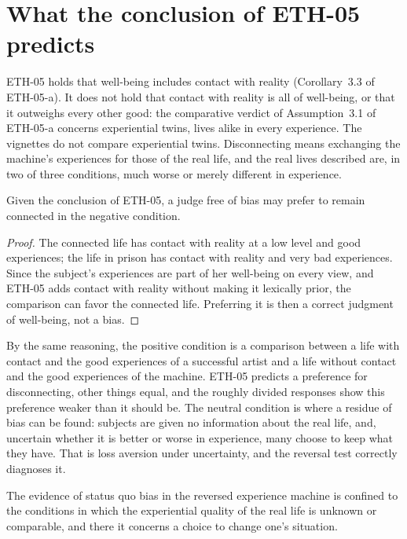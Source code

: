 \documentclass{situationist-preprint}
\begin{document}
\section{What the conclusion of ETH-05 predicts}

ETH-05 holds that well-being includes contact with reality (Corollary~3.3 of ETH-05-a). It does not hold that contact with reality is all of well-being, or that it outweighs every other good: the comparative verdict of Assumption~3.1 of ETH-05-a concerns experiential twins, lives alike in every experience. The vignettes do not compare experiential twins. Disconnecting means exchanging the machine's experiences for those of the real life, and the real lives described are, in two of three conditions, much worse or merely different in experience.

\begin{proposition}\label{p:negative}
Given the conclusion of ETH-05, a judge free of bias may prefer to remain connected in the negative condition.
\end{proposition}

\begin{proof}
The connected life has contact with reality at a low level and good experiences; the life in prison has contact with reality and very bad experiences. Since the subject's experiences are part of her well-being on every view, and ETH-05 adds contact with reality without making it lexically prior, the comparison can favor the connected life. Preferring it is then a correct judgment of well-being, not a bias.
\end{proof}

By the same reasoning, the positive condition is a comparison between a life with contact and the good experiences of a successful artist and a life without contact and the good experiences of the machine. ETH-05 predicts a preference for disconnecting, other things equal, and the roughly divided responses show this preference weaker than it should be. The neutral condition is where a residue of bias can be found: subjects are given no information about the real life, and, uncertain whether it is better or worse in experience, many choose to keep what they have. That is loss aversion under uncertainty, and the reversal test correctly diagnoses it.

\begin{corollary}\label{c:residue}
The evidence of status quo bias in the reversed experience machine is confined to the conditions in which the experiential quality of the real life is unknown or comparable, and there it concerns a choice to change one's situation.
\end{corollary}
\end{document}

